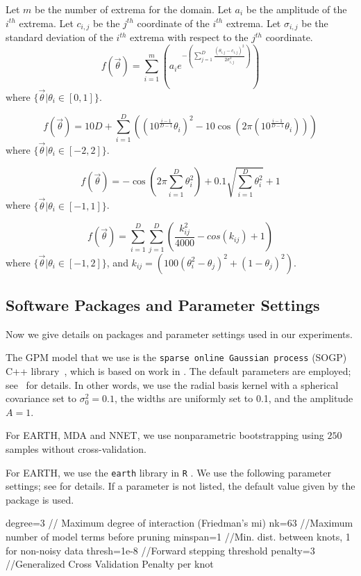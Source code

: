 Let $m$ be the number of extrema for the domain.
Let $a_i$ be the amplitude of the $i^{th}$ extrema.
Let $c_{i,j}$ be the $j^{th}$ coordinate of the $i^{th}$ extrema.
Let $\sigma_{i,j}$ be the standard deviation of the $i^{th}$ extrema with respect to the  $j^{th}$ coordinate.
$$
f(\vec{\theta}) = \sum_{i=1}^{m}\left(a_i e^{-\left(\sum_{j=1}^{D}\frac{\left(\theta_{i,j}-c_{i,j}\right)^2}{2\sigma_{i,j}^2}\right)}\right)
$$
where $\{\vec{\theta}|\theta_i\in [0,1]\}$.


$$
f(\vec{\theta}) = 10D + \sum_{i=1}^{D}\left((10^{\frac{i-1}{D-1}}\theta_i)^2 - 10\cos(2\pi(10^{\frac{i-1}{D-1}}\theta_i))\right)
$$
where
$\{\vec{\theta}|\theta_i\in [-2,2]\}$.


$$
f(\vec{\theta}) = -\cos\left(2\pi\sum_{i=1}^D\theta_i^2\right) + 0.1\sqrt{\sum_{i=1}^D\theta_i^2} + 1
$$
where $\{\vec{\theta}|\theta_i\in [-1,1]\}$.

$$
f(\vec{\theta}) = \sum_{i=1}^{D}\sum_{j=1}^{D}\left(\frac{k_{ij}^2}{4000} - cos(k_{ij}) + 1\right)
$$
where $\{\vec{\theta}|\theta_i\in [-1,2]\}$, and
$k_{ij} = (100(\theta_i^2-\theta_j)^2 + (1-\theta_j)^2)$.

\subsection{Software Packages and Parameter Settings}
\label{sec:package}

Now we give details on packages and parameter settings used in our experiments.

The GPM model that we use is the \texttt{sparse online Gaussian process} (SOGP) C++ library~\cite{gpm}, which is based on work in \cite{Csato2002,CsatoOpper2002}.
%
The default parameters are employed; see~\cite{CsatoOpper2002} for details.
%
In other words, we use the radial basis kernel with a spherical covariance set to $\sigma_0^2 = 0.1$, the widths are uniformly set to 0.1, and the amplitude $A=1$.

For EARTH, MDA and NNET, we use nonparametric bootstrapping using $250$ samples without cross-validation.

For EARTH, we use the \texttt{earth} library in \texttt{R} \cite{earth}.
%
We use the following parameter settings; see \cite{earth} for details.
%
If a parameter is not listed, the default value given by the package is used.
%
\begin{code}
degree=3 // Maximum degree of interaction (Friedman's mi)
nk=63  //Maximum number of model terms before pruning
minspan=1 //Min. dist. between knots, 1 for non-noisy data
thresh=1e-8  //Forward stepping threshold
penalty=3 //Generalized Cross Validation Penalty per knot
\end{code}

